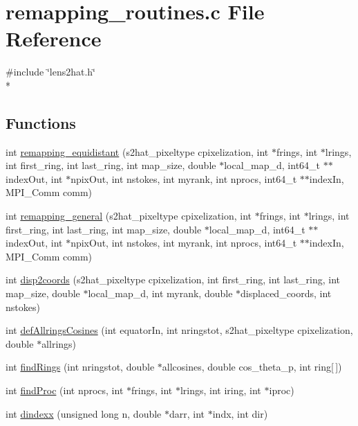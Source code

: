 \section{remapping\-\_\-routines.\-c File Reference}
\label{common_2remapping__routines_8c}
{\ttfamily \#include \char`\"{}lens2hat.\-h\char`\"{}}\\*
\subsection*{Functions}
\begin{DoxyCompactItemize}
\item 
int \hyperlink{common_2remapping__routines_8c_a2b210958001ebd22c4db83db3b89be97}{remapping\-\_\-equidistant} (s2hat\-\_\-pixeltype cpixelization, int $\ast$frings, int $\ast$lrings, int first\-\_\-ring, int last\-\_\-ring, int map\-\_\-size, double $\ast$local\-\_\-map\-\_\-d, int64\-\_\-t $\ast$$\ast$index\-Out, int $\ast$npix\-Out, int nstokes, int myrank, int nprocs, int64\-\_\-t $\ast$$\ast$index\-In, M\-P\-I\-\_\-\-Comm comm)
\item 
int \hyperlink{common_2remapping__routines_8c_abcde5d8037e169459e89439cc4d5e43c}{remapping\-\_\-general} (s2hat\-\_\-pixeltype cpixelization, int $\ast$frings, int $\ast$lrings, int first\-\_\-ring, int last\-\_\-ring, int map\-\_\-size, double $\ast$local\-\_\-map\-\_\-d, int64\-\_\-t $\ast$$\ast$index\-Out, int $\ast$npix\-Out, int nstokes, int myrank, int nprocs, int64\-\_\-t $\ast$$\ast$index\-In, M\-P\-I\-\_\-\-Comm comm)
\item 
int \hyperlink{common_2remapping__routines_8c_a8224d455c626532938c1729f5e62daee}{disp2coords} (s2hat\-\_\-pixeltype cpixelization, int first\-\_\-ring, int last\-\_\-ring, int map\-\_\-size, double $\ast$local\-\_\-map\-\_\-d, int myrank, double $\ast$displaced\-\_\-coords, int nstokes)
\item 
int \hyperlink{common_2remapping__routines_8c_af6cfda4741a11339b5a1d9c599411b87}{def\-Allrings\-Cosines} (int equator\-In, int nringstot, s2hat\-\_\-pixeltype cpixelization, double $\ast$allrings)
\item 
int \hyperlink{common_2remapping__routines_8c_a95c082e86d6e644f4789485021f90235}{find\-Rings} (int nringstot, double $\ast$allcosines, double cos\-\_\-theta\-\_\-p, int ring\mbox{[}$\,$\mbox{]})
\item 
int \hyperlink{common_2remapping__routines_8c_af4ba917a5b9f32394911c8d28d6c2d07}{find\-Proc} (int nprocs, int $\ast$frings, int $\ast$lrings, int iring, int $\ast$iproc)
\item 
int \hyperlink{common_2remapping__routines_8c_ad574f0dfca1f8db2b630a9b6cf3a45c9}{dindexx} (unsigned long n, double $\ast$darr, int $\ast$indx, int dir)
\end{DoxyCompactItemize}


